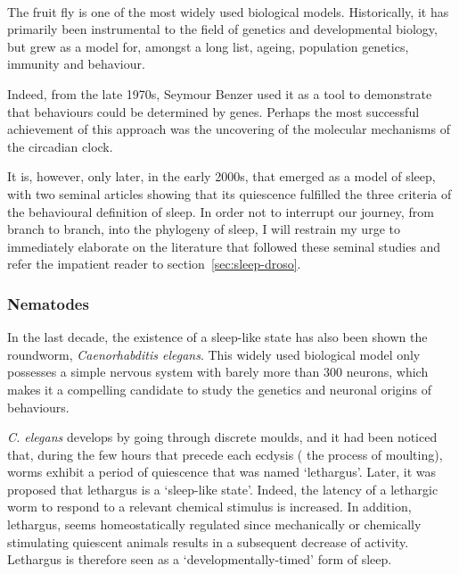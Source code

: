 \paragraph*{\droso}
The fruit fly \dmel{} is one of the most widely used biological models.
Historically, it has primarily  been  instrumental to the field of genetics and developmental biology, but grew as a model for, amongst a long list,
ageing, population genetics, immunity and behaviour\cite{hoffmann_innate_1995}.

Indeed, from the late 1970s, Seymour Benzer used it as a tool to demonstrate that behaviours could be determined by genes\cite{tully_discovery_1996}.
Perhaps the most successful achievement of this approach was the uncovering of the molecular mechanisms of the circadian clock.

It is, however, only later, in the early 2000s, that \dmel{} emerged as a model of sleep, with two seminal articles showing that its quiescence fulfilled the three criteria of the behavioural definition of sleep\cite{hendricks_rest_2000,shaw_correlates_2000}. 
In order not to interrupt our journey, from branch to branch, into the phylogeny of sleep, 
I will restrain my urge to immediately elaborate on the literature that followed these seminal studies and refer the impatient reader to section~\ref{sec:sleep-droso}.



\subsubsection{Nematodes}

In the last decade, the existence of a sleep-like state has also been shown the roundworm, \emph{Caenorhabditis elegans}\cite{trojanowski_call_2016}.
This widely used biological model only possesses a simple nervous system with barely more than 300 neurons\cite{white_structure_1986},
which makes it a compelling candidate to study the genetics and neuronal
origins of behaviours\cite{bargmann_beyond_2012}.

\emph{C. elegans} develops by going through discrete moulds, and it had been noticed that, during the few hours that precede each ecdysis (\ie{} the process of moulting), worms exhibit a period of quiescence that was named `lethargus'\cite{cassada_dauerlarva_1975}. 
Later, it was proposed that lethargus is a `sleep-like state'\cite{raizen_lethargus_2008}.
Indeed, the latency of a lethargic worm to respond to a relevant chemical stimulus is increased.
In addition, lethargus, seems homeostatically regulated since mechanically or chemically stimulating quiescent animals results in a subsequent decrease of activity\cite{raizen_lethargus_2008,iwanir_microarchitecture_2013}.
Lethargus is therefore seen as a `developmentally-timed' form of sleep\cite{trojanowski_call_2016}.


